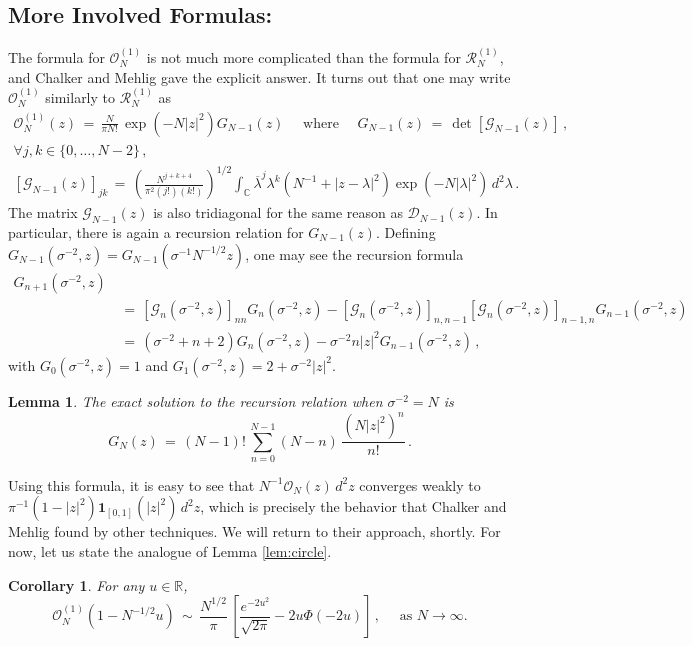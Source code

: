 \documentclass[12pt]{report}
\newtheorem{lemma}[theorem]{Lemma}
\newtheorem{corollary}[theorem]{Corollary}
\newcommand{\R}{\mathbb{R}}
\newcommand{\C}{\mathbb{C}}
\newcommand{\be}{\begin{equation}}
\newcommand{\ee}{\end{equation}}
\theoremstyle{definition}
\begin{document}
\subsection{More Involved Formulas:}
The formula for $\mathcal{O}_N^{(1)}$ is not much more complicated than the formula for $\mathcal{R}_N^{(1)}$, and Chalker and Mehlig gave the explicit answer.
It turns out that one may write $\mathcal{O}_N^{(1)}$ similarly to $\mathcal{R}_N^{(1)}$ as 
\be
\begin{gathered}
\mathcal{O}_N^{(1)}(z)\, 
=\, \frac{N}{\pi N!}\, \exp(-N|z|^2) G_{N-1}(z)\quad 
\text{ where }\quad
G_{N-1}(z)\, =\, \det[\mathcal{G}_{N-1}(z)]\, ,\\
\forall j,k \in \{0,\dots,N-2\}\, ,\quad \\
[\mathcal{G}_{N-1}(z)]_{jk}\, =\,  \left(\frac{N^{j+k+4}}{\pi^2 (j!) (k!) }\right)^{1/2} \int_{\C} \overline{\lambda}^j \lambda^k
(N^{-1}+|z-\lambda|^2) \exp(-N|\lambda|^2)\, 
d^2\lambda\, .
\end{gathered}
\ee
The matrix $\mathcal{G}_{N-1}(z)$ is also tridiagonal for the same reason as $\mathcal{D}_{N-1}(z)$.
In particular, there is again a recursion relation for $G_{N-1}(z)$.
Defining $G_{N-1}(\sigma^{-2},z) = G_{N-1}(\sigma^{-1}N^{-1/2}z)$, one may see the recursion formula
\begin{equation}
\begin{split}
G_{n+1}(\sigma^{-2},z)\, \\
&=\, [\mathcal{G}_n(\sigma^{-2},z)]_{nn} G_{n}(\sigma^{-2},z) - [\mathcal{G}_n(\sigma^{-2},z)]_{n,n-1} [\mathcal{G}_n(\sigma^{-2},z)]_{n-1,n} G_{n-1}(\sigma^{-2},z)\\
&=\, (\sigma^{-2}+n+2) G_{n}(\sigma^{-2},z)  - \sigma^{-2} n |z|^2 G_{n-1}(\sigma^{-2},z)\, ,
\end{split}
\end{equation}
with $G_0(\sigma^{-2},z) = 1$ and $G_1(\sigma^{-2},z) = 2 + \sigma^{-2}|z|^2$.
\begin{lemma}
\label{lem:G}
The exact solution to the recursion relation when $\sigma^{-2}=N$ is 
\be
\label{eq:lemG}
G_N(z)\, =\, (N-1)!\, \sum_{n=0}^{N-1} (N-n) \, \frac{(N|z|^2)^n}{n!}\, .
\ee
\end{lemma}
Using this formula, it is easy to see that $N^{-1} \mathcal{O}_N(z)\, d^2z$ converges weakly to $\pi^{-1} (1-|z|^2) \mathbf{1}_{[0,1]}(|z|^2)\, d^2z$, which is precisely the behavior
that Chalker and Mehlig found by other techniques. We will return to their approach, shortly.
For now, let us state the analogue of Lemma \ref{lem:circle}.
\begin{corollary}
For any $u \in \R$,
\be
\label{eq:Ocirc}
\mathcal{O}_N^{(1)}(1-N^{-1/2}u)\, \sim\, \frac{N^{1/2}}{\pi}\, \left[\frac{e^{-2u^2}}{\sqrt{2\pi}} - 2u\Phi(-2u)\right]\, ,\quad \text{ as $N \to \infty$.}
\ee
\end{corollary}
\end{document}
